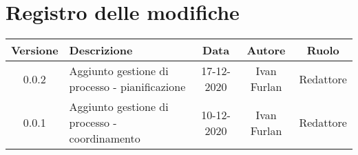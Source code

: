 \section*{Registro delle modifiche}

\begin{center}
	\begin{longtable}{|c|p{5cm}|c|c|c|}
	\hline
	\rowcolor{lighter-grayer}
	\textbf{Versione} & \textbf{Descrizione} & \textbf{Data} & \textbf{Autore} & \textbf{Ruolo} \\
	\hline
	\endfirsthead


	\hline
	0.0.2 & Aggiunto gestione di processo - pianificazione & 17-12-2020 & Ivan Furlan & Redattore \\
	0.0.1 & Aggiunto gestione di processo - coordinamento & 10-12-2020 & Ivan Furlan & Redattore \\
	\hline

	\end{longtable}
\end{center}